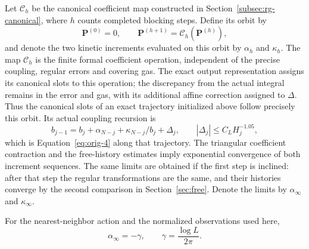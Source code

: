Let $\mathcal C_h$ be the canonical coefficient map constructed in
Section~\ref{subsec:rg-canonical}, where $h$ counts completed blocking
steps. Define its orbit by
\[
 \mathbf P^{(0)}=0,\qquad
 \mathbf P^{(h+1)}=\mathcal C_h(\mathbf P^{(h)}),
\]
and denote the two kinetic increments evaluated on this orbit by
$\alpha_h$ and $\kappa_h$. The map $\mathcal C_h$ is the finite formal
coefficient operation, independent of the precise coupling, regular
errors and covering gas. The exact output representation assigns its
canonical slots to this operation; the discrepancy from the actual
integral remains in the error and gas, with its additional affine
correction assigned to $\Delta$. Thus the canonical slots of an exact
trajectory initialized above follow precisely this orbit. Its actual
coupling recursion is
\begin{equation}
 b_{j-1}=b_j+\alpha_{N-j}+\kappa_{N-j}/b_j+\Delta_j,
 \qquad |\Delta_j|\le C_LH_j^{-1.05},
 \label{eq:shooting-actual-flow}
\end{equation}
which is Equation~\eqref{eq:orig-4} along that trajectory.
The triangular coefficient contraction and the free-history
estimates imply exponential convergence of both increment sequences. The same
limits are obtained if the first step is inclined: after that step the
regular transformations are the same, and their histories converge by
the second comparison in Section~\ref{sec:free}. Denote the limits by
$\alpha_\infty$ and $\kappa_\infty$.

\begin{lemma}
\label{lem:kinetic-increment}
For the nearest-neighbor action and the normalized observations used
here,
\begin{equation}
 \alpha_\infty=-\gamma,
 \qquad \gamma=\frac{\log L}{2\pi}.
 \label{eq:orig-11}
\end{equation}
\end{lemma}

